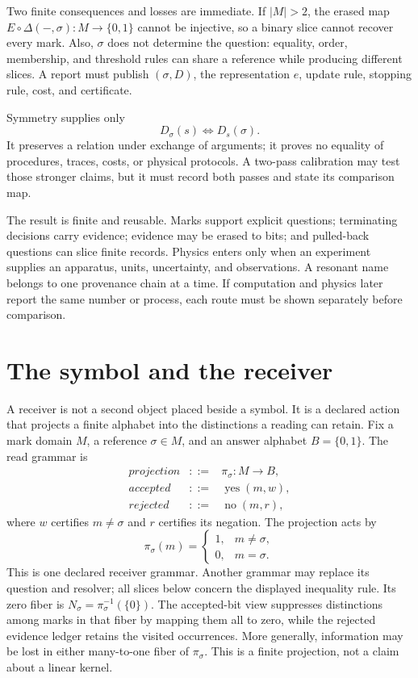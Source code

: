 Two finite consequences and losses are immediate.  If \(|M|>2\), the erased map
\(E\circ\Delta(-,\sigma):M\to\{0,1\}\) cannot be injective, so a binary
slice cannot recover every mark.  Also, \(\sigma\) does not determine the question: equality, order, membership, and
threshold rules can share a reference while producing different slices.  A report must publish \((\sigma,D)\), the
representation \(e\), update rule, stopping rule, cost, and certificate.

Symmetry supplies only
\[
 D_\sigma(s)\iff D_s(\sigma).
\]
It preserves a relation under exchange of arguments; it proves no equality of procedures, traces, costs, or physical
protocols.  A two-pass calibration may test those stronger claims, but it must record both passes and state its
comparison map.

The result is finite and reusable.  Marks support explicit questions; terminating decisions carry evidence; evidence
may be erased to bits; and pulled-back questions can slice finite records.  Physics enters only when an experiment
supplies an apparatus, units, uncertainty, and observations.  A resonant name belongs to one provenance chain at a
time.  If computation and physics later report the same number or process, each route must be shown separately before
comparison.

\section{The symbol and the receiver}

A receiver is not a second object placed beside a symbol.  It is a declared action that projects a finite alphabet into
the distinctions a reading can retain.  Fix a mark domain \(M\), a reference \(\sigma\in M\), and an answer alphabet
\(B=\{0,1\}\).  The read grammar is
\[
\begin{array}{rcl}
\textit{projection}&::=&\pi_\sigma:M\to B,\\
\textit{accepted}&::=&\operatorname{yes}(m,w),\\
\textit{rejected}&::=&\operatorname{no}(m,r),
\end{array}
\]
where \(w\) certifies \(m\ne\sigma\) and \(r\) certifies its negation.  The projection acts by
\[
 \pi_\sigma(m)=
 \begin{cases}
 1,&m\ne\sigma,\\
 0,&m=\sigma.
 \end{cases}
\]
This is one declared receiver grammar.  Another grammar may replace its question and resolver; all slices below concern
the displayed inequality rule.  Its zero fiber is \(N_\sigma=\pi_\sigma^{-1}(\{0\})\).  The accepted-bit view
suppresses distinctions among marks in that fiber by mapping them all to zero, while the rejected evidence ledger
retains the visited occurrences.  More generally, information may be lost in either many-to-one fiber of
\(\pi_\sigma\).  This is a finite projection, not a claim about a linear kernel.

